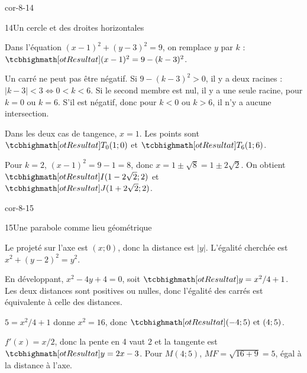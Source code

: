 \begin{blocLivre}{cor-8-14}
\begin{corrige}{14}{Un cercle et des droites horizontales}
\begin{questions}
\item Dans l’équation $(x-1)^2+(y-3)^2=9$, on remplace $y$ par $k$ :
$\res{(x-1)^2=9-(k-3)^2}$.
\item Un carré ne peut pas être négatif. Si $9-(k-3)^2>0$, il y a deux racines :
$|k-3|<3\iff0<k<6$.
Si le second membre est nul, il y a une seule racine, pour $k=0$ ou $k=6$.
S’il est négatif, donc pour $k<0$ ou $k>6$, il n’y a aucune intersection.
\item Dans les deux cas de tangence, $x=1$. Les points sont $\res{T_0(1;0)}$ et $\res{T_6(1;6)}$.
\item Pour $k=2$, $(x-1)^2=9-1=8$, donc $x=1\pm\sqrt8=1\pm2\sqrt2$.
On obtient $\res{I(1-2\sqrt2;2)}$ et $\res{J(1+2\sqrt2;2)}$.
\end{questions}
\label{figgeo-08-14-cor}
\end{corrige}
\end{blocLivre}
\begin{blocLivre}{cor-8-15}
\begin{corrige}{15}{Une parabole comme lieu géométrique}
\begin{questions}
\item Le projeté sur l’axe est $(x;0)$, donc la distance est $|y|$. L’égalité cherchée est $x^2+(y-2)^2=y^2$.
\item En développant, $x^2-4y+4=0$, soit $\res{y=x^2/4+1}$. Les deux distances sont positives ou nulles, donc l’égalité des carrés est équivalente à celle des distances.
\item $5=x^2/4+1$ donne $x^2=16$, donc $\res{(-4;5)\text{ et }(4;5)}$.
\item $f\prime(x)=x/2$, donc la pente en 4 vaut 2 et la tangente est $\res{y=2x-3}$. Pour $M(4;5)$, $MF=\sqrt{16+9}=5$, égal à la distance à l’axe.
\end{questions}

\label{figgeo-08-15-cor}
\end{corrige}
\end{blocLivre}
